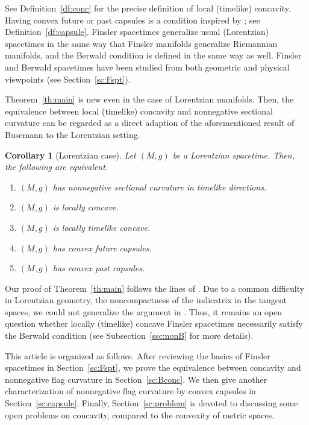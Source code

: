 \documentclass[a4paper,11pt]{article}
\numberwithin{equation}{section}
\theoremstyle{definition}
\theoremstyle{plain}
\newtheorem{corollary}[definition]{Corollary}
\begin{document}
See Definition~\ref{df:conc} for the precise definition of local (timelike) concavity.
Having convex future or past capsules is a condition inspired by \cite{KK}; see Definition~\ref{df:capsule}.
Finsler spacetimes generalize usual (Lorentzian) spacetimes
in the same way that Finsler manifolds generalize Riemannian manifolds,
and the Berwald condition is defined in the same way as well.
Finsler and Berwald spacetimes have been studied from both geometric and physical viewpoints
(see Section~\ref{sc:Fspt}).

Theorem~\ref{th:main} is new even in the case of Lorentzian manifolds.
Then, the equivalence between local (timelike) concavity and nonnegative sectional curvature
can be regarded as a direct adaption of the aforementioned result of Busemann \cite{Bu} to the Lorentzian setting.

\begin{corollary}[Lorentzian case]\label{cr:main}
Let $(M,g)$ be a Lorentzian spacetime.
Then, the following are equivalent.
\begin{enumerate}[{\rm (I)}]
\item $(M,g)$ has nonnegative sectional curvature in timelike directions.
\item $(M,g)$ is locally concave.
\item $(M,g)$ is locally timelike concave.
\item $(M,g)$ has convex future capsules.
\item $(M,g)$ has convex past capsules.
\end{enumerate}
\end{corollary}

Our proof of Theorem~\ref{th:main} follows the lines of \cite{KVK,KK}.
Due to a common difficulty in Lorentzian geometry, the noncompactness of the indicatrix in the tangent spaces,
we could not generalize the argument in \cite{IL}.
Thus, it remains an open question whether locally (timelike) concave Finsler spacetimes necessarily satisfy the Berwald condition
(see Subsection~\ref{ssc:nonB} for more details).

This article is organized as follows.
After reviewing the basics of Finsler spacetimes in Section~\ref{sc:Fspt},
we prove the equivalence between concavity and nonnegative flag curvature in Section~\ref{sc:Bconc}.
We then give another characterization of nonnegative flag curvature by convex capsules in Section~\ref{sc:capsule}.
Finally, Section~\ref{sc:problem} is devoted to discussing some open problems on concavity,
compared to the convexity of metric spaces.
\end{document}
